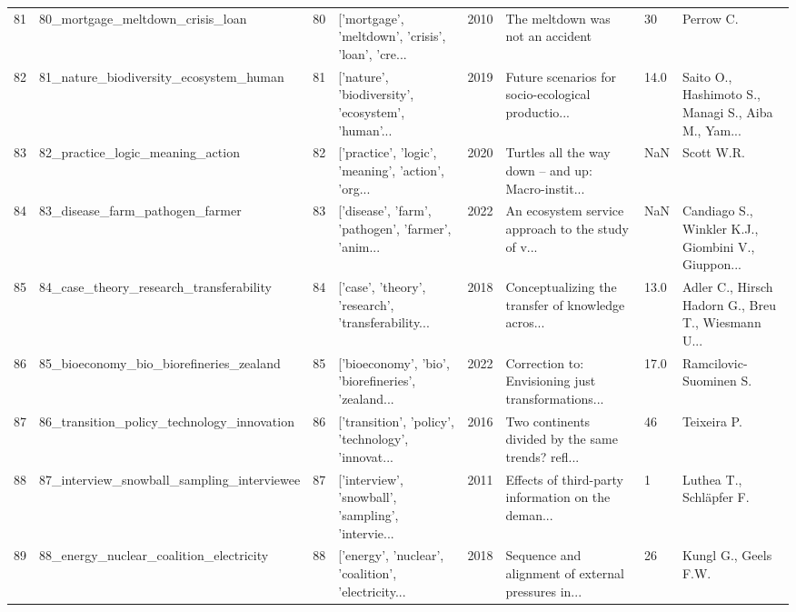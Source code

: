 \begin{tabular}{rlrlrlll}
         81 &                   80\_mortgage\_meltdown\_crisis\_loan &        80 & ['mortgage', 'meltdown', 'crisis', 'loan', 'cre... &          2010 &                   The meltdown was not an accident &      30 &                                          Perrow C. \\
         82 &             81\_nature\_biodiversity\_ecosystem\_human &        81 & ['nature', 'biodiversity', 'ecosystem', 'human'... &          2019 & Future scenarios for socio-ecological productio... &    14.0 & Saito O., Hashimoto S., Managi S., Aiba M., Yam... \\
         83 &                   82\_practice\_logic\_meaning\_action &        82 & ['practice', 'logic', 'meaning', 'action', 'org... &          2020 & Turtles all the way down – and up: Macro-instit... &     NaN &                                         Scott W.R. \\
         84 &                    83\_disease\_farm\_pathogen\_farmer &        83 & ['disease', 'farm', 'pathogen', 'farmer', 'anim... &          2022 & An ecosystem service approach to the study of v... &     NaN & Candiago S., Winkler K.J., Giombini V., Giuppon... \\
         85 &            84\_case\_theory\_research\_transferability &        84 & ['case', 'theory', 'research', 'transferability... &          2018 & Conceptualizing the transfer of knowledge acros... &    13.0 & Adler C., Hirsch Hadorn G., Breu T., Wiesmann U... \\
         86 &            85\_bioeconomy\_bio\_biorefineries\_zealand &        85 & ['bioeconomy', 'bio', 'biorefineries', 'zealand... &          2022 & Correction to: Envisioning just transformations... &    17.0 &                             Ramcilovic-Suominen S. \\
         87 &         86\_transition\_policy\_technology\_innovation &        86 & ['transition', 'policy', 'technology', 'innovat... &          2016 & Two continents divided by the same trends? refl... &      46 &                                        Teixeira P. \\
         88 &         87\_interview\_snowball\_sampling\_interviewee &        87 & ['interview', 'snowball', 'sampling', 'intervie... &          2011 & Effects of third-party information on the deman... &       1 &                            Luthea T., Schläpfer F. \\
         89 &            88\_energy\_nuclear\_coalition\_electricity &        88 & ['energy', 'nuclear', 'coalition', 'electricity... &          2018 & Sequence and alignment of external pressures in... &      26 &                               Kungl G., Geels F.W. \\

\end{tabular}
